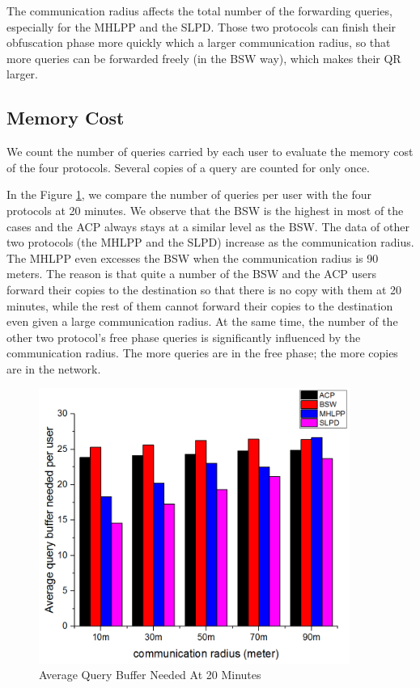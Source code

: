 The communication radius affects the total number of the forwarding queries, especially for the MHLPP and the SLPD. Those two protocols can finish their obfuscation phase more quickly which a larger communication radius, so that more queries can be forwarded freely (in the BSW way), which makes their QR larger.

\subsection{ Memory Cost}

\noindent We count the number of queries carried by each user to evaluate the memory cost of the four protocols. Several copies of a query are counted for only once.

In the Figure \ref{fig:F419AverageQueryBufferNeededAt20Minutes}, we compare the number of queries per user with the four protocols at 20 minutes. We observe that the BSW is the highest in most of the cases and the ACP always stays at a similar level as the BSW. The data of other two protocols (the MHLPP and the SLPD) increase as the communication radius. The MHLPP even excesses the BSW when the communication radius is 90 meters. The reason is that quite a number of the BSW and the ACP users forward their copies to the destination so that there is no copy with them at 20 minutes, while the rest of them cannot forward their copies to the destination even given a large communication radius. At the same time, the number of the other two protocol's free phase queries is significantly influenced by the communication radius. The more queries are in the free phase; the more copies are in the network.

\begin{figure} [hbtp]
  \centering 
  \includegraphics[width=4.0in]{figures/F419AverageQueryBufferNeededAt20Minutes.png}
  \caption{Average Query Buffer Needed At 20 Minutes} 
  \label{fig:F419AverageQueryBufferNeededAt20Minutes} %
\end{figure}

